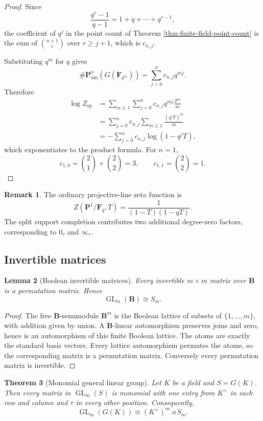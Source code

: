 \documentclass[11pt]{amsart}
\numberwithin{equation}{section}
\newtheorem{theorem}{Theorem}[section]
\newtheorem{lemma}[theorem]{Lemma}
\theoremstyle{definition}
\newtheorem{remark}[theorem]{Remark}
\newcommand{\B}{\mathbf B}
\newcommand{\F}{\mathbf F}
\newcommand{\GL}{\operatorname{GL}}
\newcommand{\Pum}{\mathbf P_{\mathrm{um}}}
\begin{document}
\begin{proof}
Since
\[
\frac{q^r-1}{q-1}=1+q+\cdots+q^{r-1},
\]
the coefficient of $q^j$ in the point count of Theorem \ref{thm:finite-field-point-count} is the sum of $\binom{n+1}{r}$ over $r\ge j+1$, which is $c_{n,j}$.

Substituting $q^m$ for $q$ gives
\[
\#\Pum^n(G(\F_{q^m}))
=
\sum_{j=0}^{n}c_{n,j}q^{mj}.
\]
Therefore
\[
\begin{aligned}
\log Z_{\mathrm{sp}}
&=
\sum_{m\ge1}\sum_{j=0}^{n}c_{n,j}q^{mj}\frac{T^m}{m}\\
&=
\sum_{j=0}^{n}c_{n,j}
\sum_{m\ge1}\frac{(q^jT)^m}{m}\\
&=
-\sum_{j=0}^{n}c_{n,j}\log(1-q^jT),
\end{aligned}
\]
which exponentiates to the product formula.  For $n=1$,
\[
c_{1,0}=\binom21+\binom22=3,
\qquad
c_{1,1}=\binom22=1.
\]
\end{proof}

\begin{remark}
The ordinary projective-line zeta function is
\[
Z(\mathbf P^1/\F_q,T)=\frac{1}{(1-T)(1-qT)}.
\]
The split support completion contributes two additional degree-zero factors, corresponding to $0_\tau$ and $\infty_\tau$.
\end{remark}

\subsection{Invertible matrices}

\begin{lemma}[Boolean invertible matrices]\label{lem:boolean-gl}
Every invertible $m\times m$ matrix over $\B$ is a permutation matrix.  Hence
\[
\GL_m(\B)\cong S_m.
\]
\end{lemma}

\begin{proof}
The free $\B$-semimodule $\B^m$ is the Boolean lattice of subsets of $\{1,\dots,m\}$, with addition given by union.  A $\B$-linear automorphism preserves joins and zero, hence is an automorphism of this finite Boolean lattice.  The atoms are exactly the standard basis vectors.  Every lattice automorphism permutes the atoms, so the corresponding matrix is a permutation matrix.  Conversely every permutation matrix is invertible.
\end{proof}

\begin{theorem}[Monomial general linear group]\label{thm:monomial-gl}
Let $K$ be a field and $S=G(K)$.  Then every matrix in $\GL_m(S)$ is monomial with one entry from $K^\times$ in each row and column and $\tau$ in every other position.  Consequently,
\[
\boxed{
\GL_m(G(K))\cong(K^\times)^m\rtimes S_m.}
\]
\end{theorem}
\end{document}

